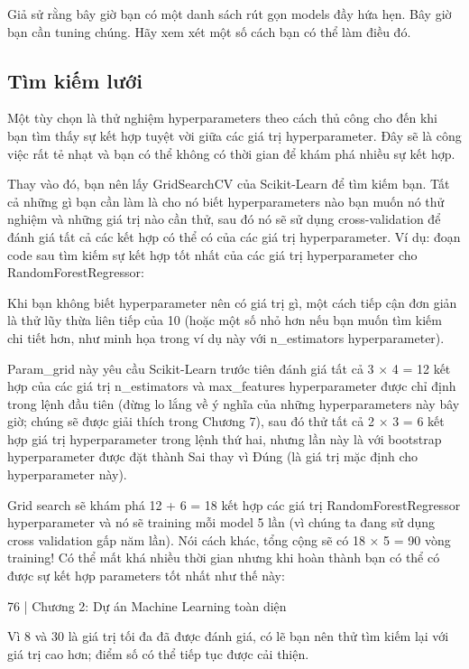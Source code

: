 Giả sử rằng bây giờ bạn có một danh sách rút gọn models đầy hứa hẹn. Bây giờ bạn cần tuning chúng. Hãy xem xét một số cách bạn có thể làm điều đó.

\subsection{Tìm kiếm lưới}

Một tùy chọn là thử nghiệm hyperparameters theo cách thủ công cho đến khi bạn tìm thấy sự kết hợp tuyệt vời giữa các giá trị hyperparameter. Đây sẽ là công việc rất tẻ nhạt và bạn có thể không có thời gian để khám phá nhiều sự kết hợp.

Thay vào đó, bạn nên lấy GridSearchCV của Scikit-Learn để tìm kiếm bạn. Tất cả những gì bạn cần làm là cho nó biết hyperparameters nào bạn muốn nó thử nghiệm và những giá trị nào cần thử, sau đó nó sẽ sử dụng cross-validation để đánh giá tất cả các kết hợp có thể có của các giá trị hyperparameter. Ví dụ: đoạn code sau tìm kiếm sự kết hợp tốt nhất của các giá trị hyperparameter cho RandomForestRegressor:

Khi bạn không biết hyperparameter nên có giá trị gì, một cách tiếp cận đơn giản là thử lũy thừa liên tiếp của 10 (hoặc một số nhỏ hơn nếu bạn muốn tìm kiếm chi tiết hơn, như minh họa trong ví dụ này với n\_estimators hyperparameter).

Param\_grid này yêu cầu Scikit-Learn trước tiên đánh giá tất cả 3 × 4 = 12 kết hợp của các giá trị n\_estimators và max\_features hyperparameter được chỉ định trong lệnh đầu tiên (đừng lo lắng về ý nghĩa của những hyperparameters này bây giờ; chúng sẽ được giải thích trong Chương 7), sau đó thử tất cả 2 × 3 = 6 kết hợp giá trị hyperparameter trong lệnh thứ hai, nhưng lần này là với bootstrap hyperparameter được đặt thành Sai thay vì Đúng (là giá trị mặc định cho hyperparameter này).

Grid search sẽ khám phá 12 + 6 = 18 kết hợp các giá trị RandomForestRegressor hyperparameter và nó sẽ training mỗi model 5 lần (vì chúng ta đang sử dụng cross validation gấp năm lần). Nói cách khác, tổng cộng sẽ có 18 × 5 = 90 vòng training! Có thể mất khá nhiều thời gian nhưng khi hoàn thành bạn có thể có được sự kết hợp parameters tốt nhất như thế này:

76 | Chương 2: Dự án Machine Learning toàn diện

Vì 8 và 30 là giá trị tối đa đã được đánh giá, có lẽ bạn nên thử tìm kiếm lại với giá trị cao hơn; điểm số có thể tiếp tục được cải thiện.

